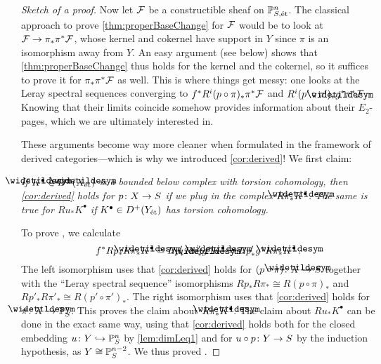 \documentclass[a4paper, 10pt, oneside, DIV=9, chapterprefix=true, numbers=enddot, bibliography=totoc]{scrbook}
\begin{document}
\begin{proof}[Sketch of a proof]
	Now let $\mathcal{F}$ be a constructible sheaf on $\mathbb{P}_{S,\mathrm{\acute{e}t}}^n$. The classical approach to prove \cref{thm:properBaseChange} for $\mathcal{F}$ would be to look at $\Ff\morphism\pi_*\pi^*\Ff$, whose kernel and cokernel have support in $Y$ since $\pi$ is an isomorphism away from $Y$. An easy argument (see below) shows that \cref{thm:properBaseChange} thus holds for the kernel and the cokernel, so it suffices to prove it for $\pi_*\pi^*\mathcal{F}$ as well. This is where things get messy: one looks at the Leray spectral sequences converging to $f^*R^i(p\circ \pi)_*\pi^*\mathcal{F}$ and $R^i(p'\circ \pi')_*\snake{g}^*\pi^*\Ff$. Knowing that their limits coincide somehow provides information about their $E_2$-pages, which we are ultimately interested in.
	
	These arguments become way more cleaner when formulated in the framework of derived categories---which is why we introduced \cref{cor:derived}! We first claim:
	\begin{alphanumerate}
		\item[\itememph{*}] \itshape If $\snake{K}^\bullet\in D^+(\snake{X}_\et)$ is a bounded below complex with torsion cohomology, then \cref{cor:derived} holds for $p\colon X\morphism S$ if we plug in the complex $R\pi_*\snake{K}^\bullet$. The same is true for $Ru_*K^\bullet$ if $K^\bullet\in D^+(Y_{\mathrm{\acute{e}t}})$ has torsion cohomology.
	\end{alphanumerate}
	To prove \itememph{*}, we calculate
	\begin{equation*}
		f^*Rp_*R\pi_*\snake{K}^\bullet \cong Rp'_*R\pi'_*\snake{g}^*\snake{K}^\bullet\cong Rp'_*g^*R\pi_*\snake{K}^\bullet\,.
	\end{equation*}
	The left isomorphism uses that \cref{cor:derived} holds for $(p\circ \pi)\colon \snake{X}\morphism S$ together with the \enquote{Leray spectral sequence} isomorphisms $Rp_*R\pi_*\cong R(p\circ \pi)_*$ and $Rp'_*R\pi'_*\cong R(p'\circ \pi')_*$. The right isomorphism uses that \cref{cor:derived} holds for $\pi\colon \snake{X}\morphism \IP_S^n$. This proves the claim about $R\pi_*\snake{K}^\bullet$. The claim about $Ru_*K^\bullet$ can be done in the exact same way, using that \cref{cor:derived} holds both for the closed embedding $u\colon Y\monomorphism \IP_S^n$ by \cref{lem:dimLeq1} and for $u\circ p\colon Y\morphism S$ by the induction hypothesis, as $Y\cong \mathbb{P}_S^{n-2}$. We thus proved \itememph{*}.
	

\end{proof}
\end{document}
